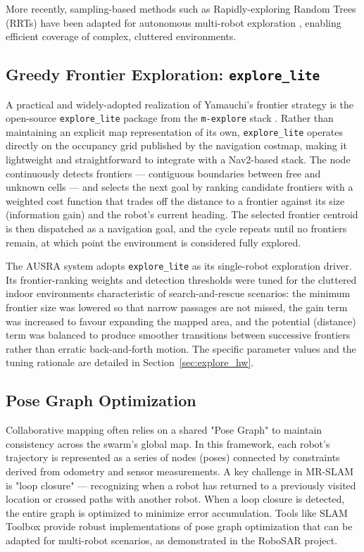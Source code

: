 More recently, sampling-based methods such as Rapidly-exploring Random Trees (RRTs) have been adapted for autonomous multi-robot exploration \cite{umari2017autonomous}, enabling efficient coverage of complex, cluttered environments.

\subsection{Greedy Frontier Exploration: \texttt{explore\_lite}}
\label{subsec:explore_lite}
A practical and widely-adopted realization of Yamauchi's frontier strategy is the open-source \texttt{explore\_lite} package from the \texttt{m-explore} stack \cite{hornerexplore}. Rather than maintaining an explicit map representation of its own, \texttt{explore\_lite} operates directly on the occupancy grid published by the navigation costmap, making it lightweight and straightforward to integrate with a Nav2-based stack. The node continuously detects frontiers --- contiguous boundaries between free and unknown cells --- and selects the next goal by ranking candidate frontiers with a weighted cost function that trades off the distance to a frontier against its size (information gain) and the robot's current heading. The selected frontier centroid is then dispatched as a navigation goal, and the cycle repeats until no frontiers remain, at which point the environment is considered fully explored.

The AUSRA system adopts \texttt{explore\_lite} as its single-robot exploration driver. Its frontier-ranking weights and detection thresholds were tuned for the cluttered indoor environments characteristic of search-and-rescue scenarios: the minimum frontier size was lowered so that narrow passages are not missed, the gain term was increased to favour expanding the mapped area, and the potential (distance) term was balanced to produce smoother transitions between successive frontiers rather than erratic back-and-forth motion. The specific parameter values and the tuning rationale are detailed in Section~\ref{sec:explore_hw}.

\subsection{Pose Graph Optimization}
Collaborative mapping often relies on a shared "Pose Graph" to maintain consistency across the swarm's global map. In this framework, each robot's trajectory is represented as a series of nodes (poses) connected by constraints derived from odometry and sensor measurements. A key challenge in MR-SLAM is "loop closure" --- recognizing when a robot has returned to a previously visited location or crossed paths with another robot. When a loop closure is detected, the entire graph is optimized to minimize error accumulation. Tools like SLAM Toolbox \cite{macenski2021slam} provide robust implementations of pose graph optimization that can be adapted for multi-robot scenarios, as demonstrated in the RoboSAR project.

